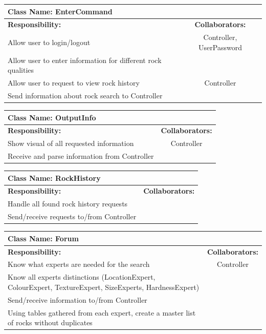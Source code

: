 \documentclass[titlepage]{article}
\begin{document}
\begin{table}[!ht]
	\centering
	\begin{tabular}{| p{6.6cm} | c |} \hline
		\multicolumn{2}{|l|}{\textbf{Class Name: EnterCommand}} \\ \hline
		\textbf{Responsibility:} & \textbf{Collaborators:} \\ \hline
		Allow user to login/logout & Controller, UserPassword\\ \hline
		Allow user to enter information for different rock qualities & \\ \hline
		Allow user to request to view rock history & Controller\\ \hline
		Send information about rock search to Controller & \\ \hline
	\end{tabular}
\end{table}

\begin{table}[!ht]
	\centering
	\begin{tabular}{| p{8cm} | c |} \hline 
		\multicolumn{2}{|l|}{\textbf{Class Name: OutputInfo}} \\ \hline
		\textbf{Responsibility:} & \textbf{Collaborators:} \\ \hline
		Show visual of all requested information & Controller\\ \hline
		Receive and parse information from Controller & \\ \hline
	\end{tabular}
\end{table}

\begin{table}[!ht]
	\centering
	\begin{tabular}{| p{8cm} | c |} \hline 
		\multicolumn{2}{|l|}{\textbf{Class Name: RockHistory}} \\ \hline
		\textbf{Responsibility:} & \textbf{Collaborators:} \\ \hline
		Handle all found rock history requests & \\ \hline
		Send/receive requests to/from Controller & \\ \hline
	\end{tabular}
\end{table}
\pagebreak

\begin{table}[!ht]
	\centering
	\begin{tabular}{| p{8cm} | c |} \hline 
		\multicolumn{2}{|l|}{\textbf{Class Name: Forum}} \\ \hline
		\textbf{Responsibility:} & \textbf{Collaborators:} \\ \hline
		Know what experts are needed for the search & Controller\\ \hline
		Know all experts distinctions (LocationExpert, ColourExpert, TextureExpert, SizeExperts, HardnessExpert) & \\ \hline
		Send/receive information to/from Controller & \\ \hline
		Using tables gathered from each expert, create a master list of rocks without duplicates & \\ \hline
	\end{tabular}
\end{table}
\end{document}

